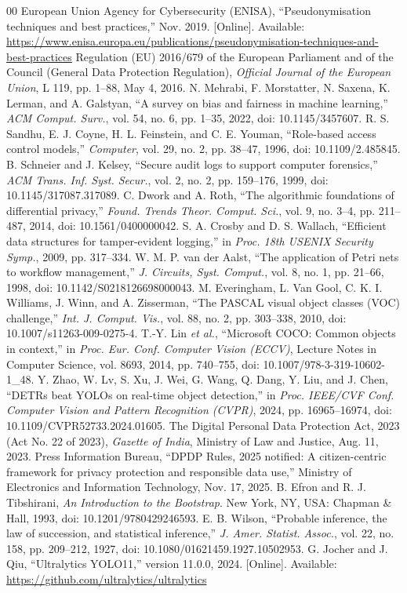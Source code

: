 \documentclass{ieeeaccess}
\begin{document}
\begin{thebibliography}{00}
 European Union Agency for Cybersecurity (ENISA), ``Pseudonymisation techniques and best practices,'' Nov. 2019. [Online]. Available: \url{https://www.enisa.europa.eu/publications/pseudonymisation-techniques-and-best-practices}
 Regulation (EU) 2016/679 of the European Parliament and of the Council (General Data Protection Regulation), \textit{Official Journal of the European Union}, L 119, pp. 1--88, May 4, 2016.
 N. Mehrabi, F. Morstatter, N. Saxena, K. Lerman, and A. Galstyan, ``A survey on bias and fairness in machine learning,'' \textit{ACM Comput. Surv.}, vol. 54, no. 6, pp. 1--35, 2022, doi: 10.1145/3457607.
 R. S. Sandhu, E. J. Coyne, H. L. Feinstein, and C. E. Youman, ``Role-based access control models,'' \textit{Computer}, vol. 29, no. 2, pp. 38--47, 1996, doi: 10.1109/2.485845.
 B. Schneier and J. Kelsey, ``Secure audit logs to support computer forensics,'' \textit{ACM Trans. Inf. Syst. Secur.}, vol. 2, no. 2, pp. 159--176, 1999, doi: 10.1145/317087.317089.
 C. Dwork and A. Roth, ``The algorithmic foundations of differential privacy,'' \textit{Found. Trends Theor. Comput. Sci.}, vol. 9, no. 3--4, pp. 211--487, 2014, doi: 10.1561/0400000042.
 S. A. Crosby and D. S. Wallach, ``Efficient data structures for tamper-evident logging,'' in \textit{Proc. 18th USENIX Security Symp.}, 2009, pp. 317--334.
 W. M. P. van der Aalst, ``The application of Petri nets to workflow management,'' \textit{J. Circuits, Syst. Comput.}, vol. 8, no. 1, pp. 21--66, 1998, doi: 10.1142/S0218126698000043.
 M. Everingham, L. Van Gool, C. K. I. Williams, J. Winn, and A. Zisserman, ``The PASCAL visual object classes (VOC) challenge,'' \textit{Int. J. Comput. Vis.}, vol. 88, no. 2, pp. 303--338, 2010, doi: 10.1007/s11263-009-0275-4.
 T.-Y. Lin \textit{et al.}, ``Microsoft COCO: Common objects in context,'' in \textit{Proc. Eur. Conf. Computer Vision (ECCV)}, Lecture Notes in Computer Science, vol. 8693, 2014, pp. 740--755, doi: 10.1007/978-3-319-10602-1\_48.
 Y. Zhao, W. Lv, S. Xu, J. Wei, G. Wang, Q. Dang, Y. Liu, and J. Chen, ``DETRs beat YOLOs on real-time object detection,'' in \textit{Proc. IEEE/CVF Conf. Computer Vision and Pattern Recognition (CVPR)}, 2024, pp. 16965--16974, doi: 10.1109/CVPR52733.2024.01605.
 The Digital Personal Data Protection Act, 2023 (Act No. 22 of 2023), \textit{Gazette of India}, Ministry of Law and Justice, Aug. 11, 2023.
 Press Information Bureau, ``DPDP Rules, 2025 notified: A citizen-centric framework for privacy protection and responsible data use,'' Ministry of Electronics and Information Technology, Nov. 17, 2025.
 B. Efron and R. J. Tibshirani, \textit{An Introduction to the Bootstrap}. New York, NY, USA: Chapman \& Hall, 1993, doi: 10.1201/9780429246593.
 E. B. Wilson, ``Probable inference, the law of succession, and statistical inference,'' \textit{J. Amer. Statist. Assoc.}, vol. 22, no. 158, pp. 209--212, 1927, doi: 10.1080/01621459.1927.10502953.
 G. Jocher and J. Qiu, ``Ultralytics YOLO11,'' version 11.0.0, 2024. [Online]. Available: \url{https://github.com/ultralytics/ultralytics}
\end{thebibliography}
\end{document}
